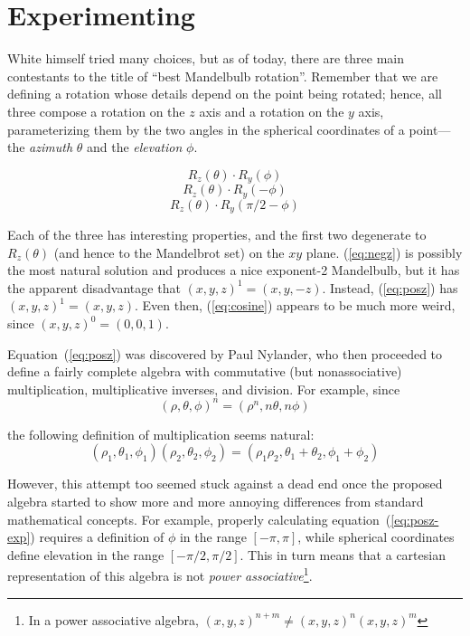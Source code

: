\documentclass{article}
\begin{document}
\section{Experimenting}
\label{sec:experimenting}

White himself tried many choices, but as of today, there are three
main contestants to the title of ``best Mandelbulb rotation''.
Remember that we are defining a rotation whose details depend on the
point being rotated; hence, all three compose a rotation on the $z$ axis
and a rotation on the $y$ axis, parameterizing them by the two angles in
the spherical coordinates of a point---the \emph{azimuth} $\theta$ and
the \emph{elevation} $\phi$.

\begin{equation}
\label{eq:negz}
  R_z(\theta) \cdot R_y(\phi)
\end{equation}
\begin{equation}
\label{eq:posz}
  R_z(\theta) \cdot R_y(-\phi)
\end{equation}
\begin{equation}
\label{eq:cosine}
  R_z(\theta) \cdot R_y(\pi/2-\phi)
\end{equation}

Each of the three has interesting properties, and the first two
degenerate to $R_z(\theta)$ (and hence to the Mandelbrot set) on the
$xy$ plane.  (\ref{eq:negz}) is possibly the most natural solution and
produces a nice exponent-2 Mandelbulb, but it has the apparent
disadvantage that $(x,y,z)^1=(x,y,-z)$.  Instead, (\ref{eq:posz}) has
$(x,y,z)^1=(x,y,z)$.  Even then, (\ref{eq:cosine}) appears to be
much more weird, since $(x,y,z)^0=(0,0,1)$.

Equation~(\ref{eq:posz}) was discovered by Paul Nylander, who then proceeded to
define a fairly complete algebra with commutative (but nonassociative)
multiplication, multiplicative inverses, and division.  For example,
since
\begin{equation}
  \label{eq:posz-exp}
  (\rho,\theta,\phi)^n=(\rho^n, n\theta, n\phi)
\end{equation}

\noindent
the following definition of multiplication seems natural:
\begin{equation*}
  (\rho_1,\theta_1,\phi_1) (\rho_2,\theta_2,\phi_2)=
  (\rho_1 \rho_2,\theta_1+\theta_2,\phi_1+\phi_2)
\end{equation*}

\noindent
However, this attempt too seemed stuck against a dead end once the
proposed algebra started to show more and more annoying differences
from standard mathematical concepts.  For example, properly
calculating equation~(\ref{eq:posz-exp}) requires a definition of
$\phi$ in the range $[-\pi,\pi]$, while spherical coordinates define
elevation in the range $[-\pi/2,\pi/2]$.  This in turn means that a
cartesian representation of this algebra is not \emph{power
  associative}\footnote{In a power associative algebra, $(x,y,z)^{n+m}
  \ne (x,y,z)^n (x,y,z)^m$}.
\end{document}
